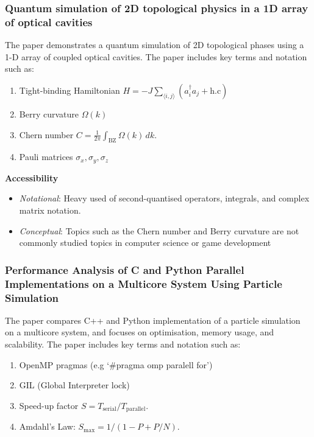 \subsubsection*{Quantum simulation of 2D topological physics in a 1D array of optical cavities}

The paper  demonstrates a quantum simulation of 2D topological phases using a 1-D array of coupled optical cavities.
The paper includes key terms and notation such as:

\begin{enumerate}
    \item Tight-binding Hamiltonian $H = -J\sum_{\langle i, j\rangle} (a_i^\dagger a_j + \text{h.c})$
    \item Berry curvature $\Omega(k)$
    \item Chern number $C = \frac{1}{2\pi}\int_{\text{BZ}}\Omega(k)\,dk$.
    \item Pauli matrices $\sigma_x,\sigma_y,\sigma_z$
\end{enumerate}

\textbf{Accessibility}

\begin{itemize}
    \item \emph{Notational}: Heavy used of second-quantised operators, integrals, and complex matrix notation.
    \item \emph{Conceptual}: Topics such as the Chern number and Berry curvature are not commonly studied topics in computer science or game development
\end{itemize}

\subsubsection*{Performance Analysis of C and Python Parallel Implementations on a Multicore System Using Particle Simulation}

The paper  compares C++ and Python implementation of a particle simulation on a multicore system, and focuses on optimisation,
memory usage, and scalability.
The paper includes key terms and notation such as:

\begin{enumerate}
    \item OpenMP pragmas (e.g `\#pragma omp paralell for')
    \item GIL (Global Interpreter lock)
    \item Speed-up factor $S = T_{\text{serial}}/T_{\text{parallel}}$.
    \item Amdahl's Law: $S_{\text{max}} = 1/(1-P + P/N)$.
\end{enumerate}

